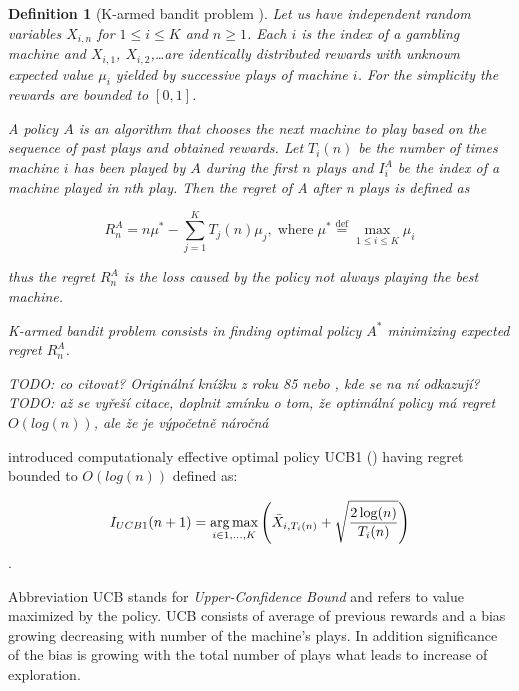 \begin{samepage}
\newtheorem*{defmab}{Definition}
\begin{defmab}[K-armed bandit problem ] 

Let us have independent random variables $X_{i,n}$ for $1 \le i \le K$ and $n \ge 1$. Each $i$ is
the index of a gambling machine and $X_{i,1}$, $X_{i,2}$,\ldots are identically distributed rewards
with unknown expected value $\mu_i$ yielded by successive plays of machine $i$. For the simplicity
the rewards are bounded to $[0,1]$.

A policy $A$ is an algorithm that chooses the next machine to play based on the sequence of
past plays and obtained rewards. Let $T_i(n)$ be the number of times machine $i$ has been played by
$A$ during the first $n$ plays and $I_i^A$ be the index of a machine played in nth play. Then the
regret of A after n plays is defined as

\begin{equation}
R_n^A = n \mu^* - \sum_{j=1}^K T_j(n) \mu_j \mathrm{,\;where}\;\mu^* \stackrel{\mathrm{def}}{=}
\max_{1 \le i \le K} \mu_i
\end{equation}

thus the regret $R_n^A$ is the loss caused by the policy not always playing the best machine.

K-armed bandit problem consists in finding optimal policy $A^*$ minimizing
expected regret $R_n^A$.

\end{defmab}
\end{samepage}

\emph{TODO: co citovat? Originální knížku z roku 85 nebo \cite{Auer2002}, kde se na ní odkazují?}
\emph{TODO: až se vyřeší citace, doplnit zmínku o tom, že optimální policy má regret  ~$O(log(n))$,
ale že je výpočetně náročná}

 introduced computationaly effective optimal policy UCB1 (\cite{Auer2002}) having
regret bounded to $O(log(n))$ defined as:

\begin{equation}
 I_{UCB1}(n+1) = \operatorname*{arg\,max}\limits_{i\in{1,\ldots,K}} \left({\bar{X}_{i,T_i(n)} 
+ \sqrt{{2 \log (n)} \over T_i(n)}}\right)
 \end{equation}.

Abbreviation UCB stands for \emph{Upper-Confidence Bound} and refers to value maximized by the
policy. UCB consists of average of previous rewards and a bias growing decreasing with number of the
machine's plays. In addition significance of the bias is growing with the total number of plays what
leads to increase of exploration.

